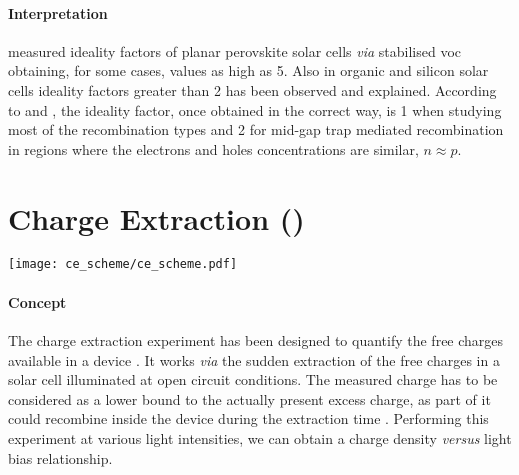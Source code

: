 		\paragraph{Interpretation} %
		 measured ideality factors of planar perovskite solar cells \textsl{via} stabilised \gls{voc} obtaining, for some cases, values as high as 5.
		Also in organic \cite{Kirchartz2011,Kirchartz2012} and silicon solar cells \cite{Breitenstein2006} ideality factors greater than 2 has been observed and explained.
		According to  and , the ideality factor, once obtained in the correct way, is 1 when studying most of the recombination types and 2 for mid-gap trap mediated recombination in regions where the electrons and holes concentrations are similar, $n \approx p$.

		\FloatBarrier
		\newpage
\section{Charge Extraction ()}\label{characterization_ce}

	\begin{SCfigure}
		\centering
		\texttt{[image: ce\_scheme/ce\_scheme.pdf]}
		\label{fig:ce_scheme}
	\end{SCfigure}


	\paragraph{Concept}
	The charge extraction experiment has been designed to quantify the free charges available in a device \cite{Duffy2000,Barnes2011}.
	It works \textsl{via} the sudden extraction of the free charges in a solar cell illuminated at open circuit conditions.
	The measured charge has to be considered as a lower bound to the actually present excess charge, as part of it could recombine inside the device during the extraction time \cite{ORegan2005}.
	Performing this experiment at various light intensities, we can obtain a charge density \textsl{versus} light bias relationship.

